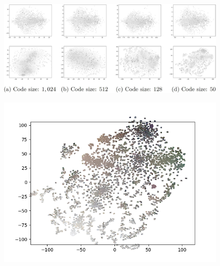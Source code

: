 \begin{frame}
	\begin{figure}
		\includegraphics[width=\textwidth]{images/figures/presentation/tsne-DSM.jpg}
	\end{figure}
\end{frame}

\begin{frame}
	\begin{figure}
		\includegraphics[width=\textwidth]{images/figures/experiments_latent/convolutional_dim50_images.png}
	\end{figure}
\end{frame}

